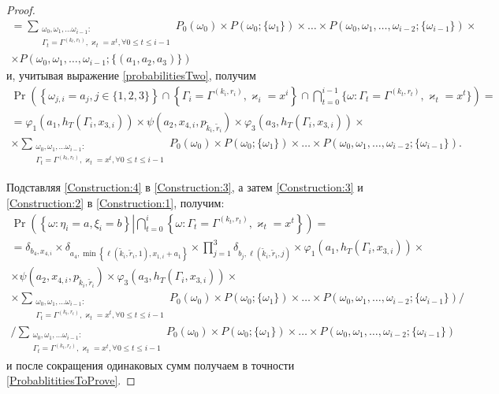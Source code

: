 \documentclass[a4paper,12pt,russian]{extarticle}
\newcommand{\mll}[1]{\begin{multline*}#1\end{multline*}}
\begin{document}
\begin{proof}
\begin{multline*}
= \sum_{\substack{\omega_0, \omega_1,\ldots \omega_{i-1} \colon \\ \Gamma_t=\Gamma^{(k_t,r_t)}, \varkappa_t=x^t, \forall 0\leqslant t \leqslant i-1}} P_0(\omega_0)\times P(\omega_0;\{\omega_1\})\times\ldots\times P(\omega_0,\omega_1,\ldots, \omega_{i-2};\{\omega_{i-1}\})\times\\
\times  P(\omega_0,\omega_1,\ldots, \omega_{i-1};\{(a_1, a_2, a_3)\})
\end{multline*}
и, учитывая выражение \eqref{probabilitiesTwo}, получим
\begin{multline}
\Pr\left( \left\{ \omega_{j,i} = a_j, j\in \{1, 2, 3\}\right\} \cap \left\{\Gamma_i=\Gamma^{(k_i,r_i)}, \varkappa_i=x^i\right\} \cap \bigcap_{t=0}^{i-1}\{\omega\colon \Gamma_t=\Gamma^{(k_t,r_t)}, \varkappa_t=x^t\}\right) =\\
=\varphi_1(a_1,h_T(\Gamma_i,x_{3,i})) \times \psi(a_2,x_{4,i}, p_{\tilde{k}_i,\tilde{r}_i}) \times \varphi_3(a_3,h_T(\Gamma_i,x_{3,i})) \times \\ 
\times \sum_{\substack{\omega_0, \omega_1,\ldots \omega_{i-1} \colon \\ \Gamma_t=\Gamma^{(k_t,r_t)}, \varkappa_t=x^t, \forall 0\leqslant t \leqslant i-1}} P_0(\omega_0)\times P(\omega_0;\{\omega_1\})\times\ldots\times P(\omega_0,\omega_1,\ldots, \omega_{i-2};\{\omega_{i-1}\}).
\label{Construction:4}
\end{multline}

Подставляя  \eqref{Construction:4} в \eqref{Construction:3}, а затем \eqref{Construction:3} и \eqref{Construction:2} в \eqref{Construction:1}, получим:
\mll
{
\Pr \left(\left\{ \omega \colon \eta_i = a, \xi_i=b\right\}  \left| \bigcap_{t=0}^{i}\left\{\omega\colon \Gamma_t=\Gamma^{(k_t,r_t)}, \varkappa_t=x^t\right\}\right.\right)  = \\
= \delta_{b_4,x_{4,i}} \times \delta_{a_4,\min\left\{\ell(\tilde{k}_i,\tilde{r}_i,1), x_{1,i}+a_1\right\}} \times \prod_{j=1}^3\delta_{b_j,\ell(\tilde{k}_i,\tilde{r}_i,j)} \times
\varphi_1(a_1,h_T(\Gamma_i,x_{3,i})) \times \\ \times \psi(a_2,x_{4,i}, p_{\tilde{k}_i,\tilde{r}_i}) 
\times  \varphi_3(a_3,h_T(\Gamma_i,x_{3,i})) \times \\ 
\times \sum_{\substack{\omega_0, \omega_1,\ldots \omega_{i-1} \colon \\ \Gamma_t=\Gamma^{(k_t,r_t)}, \varkappa_t=x^t, \forall 0\leqslant t \leqslant i-1}} P_0(\omega_0)\times P(\omega_0;\{\omega_1\})\times\ldots\times P(\omega_0,\omega_1,\ldots, \omega_{i-2};\{\omega_{i-1}\}) \Big/ \\
\Big/ \sum_{\substack{\omega_0, \omega_1,\ldots \omega_{i-1} \colon \\ \Gamma_t=\Gamma^{(k_t,r_t)}, \varkappa_t=x^t, \forall 0\leqslant t \leqslant i-1}} P_0(\omega_0)\times P(\omega_0;\{\omega_1\})\times\ldots\times P(\omega_0,\omega_1,\ldots, \omega_{i-2};\{\omega_{i-1}\})
}
и после сокращения одинаковых сумм получаем в точности \eqref{ProbablititiesToProve}.
\end{proof}
\end{document}

